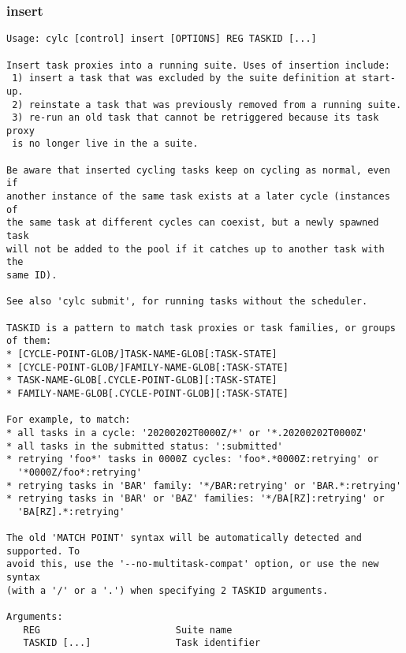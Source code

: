 \subsubsection{insert}
\label{insert}
\begin{lstlisting}
Usage: cylc [control] insert [OPTIONS] REG TASKID [...] 

Insert task proxies into a running suite. Uses of insertion include:
 1) insert a task that was excluded by the suite definition at start-up.
 2) reinstate a task that was previously removed from a running suite.
 3) re-run an old task that cannot be retriggered because its task proxy
 is no longer live in the a suite.

Be aware that inserted cycling tasks keep on cycling as normal, even if
another instance of the same task exists at a later cycle (instances of
the same task at different cycles can coexist, but a newly spawned task
will not be added to the pool if it catches up to another task with the
same ID).

See also 'cylc submit', for running tasks without the scheduler.

TASKID is a pattern to match task proxies or task families, or groups of them:
* [CYCLE-POINT-GLOB/]TASK-NAME-GLOB[:TASK-STATE]
* [CYCLE-POINT-GLOB/]FAMILY-NAME-GLOB[:TASK-STATE]
* TASK-NAME-GLOB[.CYCLE-POINT-GLOB][:TASK-STATE]
* FAMILY-NAME-GLOB[.CYCLE-POINT-GLOB][:TASK-STATE]

For example, to match:
* all tasks in a cycle: '20200202T0000Z/*' or '*.20200202T0000Z'
* all tasks in the submitted status: ':submitted'
* retrying 'foo*' tasks in 0000Z cycles: 'foo*.*0000Z:retrying' or
  '*0000Z/foo*:retrying'
* retrying tasks in 'BAR' family: '*/BAR:retrying' or 'BAR.*:retrying'
* retrying tasks in 'BAR' or 'BAZ' families: '*/BA[RZ]:retrying' or
  'BA[RZ].*:retrying'

The old 'MATCH POINT' syntax will be automatically detected and supported. To
avoid this, use the '--no-multitask-compat' option, or use the new syntax
(with a '/' or a '.') when specifying 2 TASKID arguments.

Arguments:
   REG                        Suite name
   TASKID [...]               Task identifier


\end{lstlisting}

